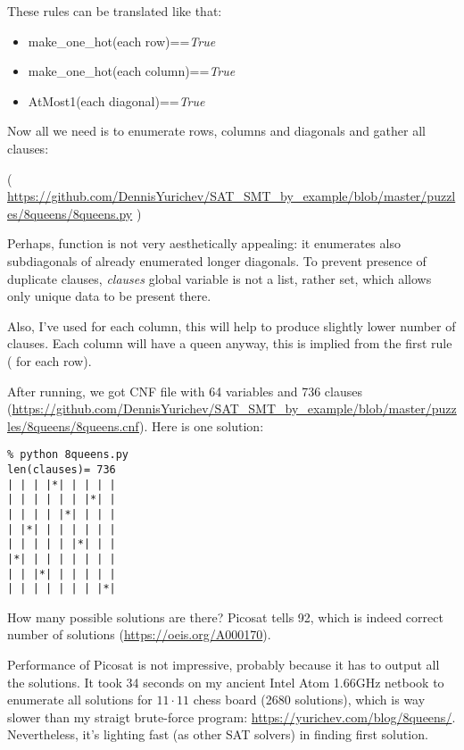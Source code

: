 These rules can be translated like that:

\begin{itemize}
\item make\_one\_hot(each row)==\emph{True}

\item make\_one\_hot(each column)==\emph{True}

\item AtMost1(each diagonal)==\emph{True}
\end{itemize}

Now all we need is to enumerate rows, columns and diagonals and gather all clauses:


( \url{https://github.com/DennisYurichev/SAT_SMT_by_example/blob/master/puzzles/8queens/8queens.py} )

Perhaps,  function is not very aesthetically appealing: it enumerates also subdiagonals
of already enumerated longer diagonals.
To prevent presence of duplicate clauses, \emph{clauses} global variable is not a list, rather set, which allows
only unique data to be present there.

Also, I've used  for each column, this will help to produce slightly lower number of clauses.
Each column will have a queen anyway, this is implied from the first rule ( for each row).

After running, we got CNF file with 64 variables and 736 clauses (\url{https://github.com/DennisYurichev/SAT_SMT_by_example/blob/master/puzzles/8queens/8queens.cnf}).
Here is one solution:

\begin{lstlisting}
% python 8queens.py
len(clauses)= 736
| | | |*| | | | |
| | | | | | |*| |
| | | | |*| | | |
| |*| | | | | | |
| | | | | |*| | |
|*| | | | | | | |
| | |*| | | | | |
| | | | | | | |*|
\end{lstlisting}

How many possible solutions are there?
Picosat tells 92, which is indeed correct number of solutions (\url{https://oeis.org/A000170}).

Performance of Picosat is not impressive, probably because it has to output all the solutions.
It took 34 seconds on my ancient Intel Atom 1.66GHz netbook to enumerate all solutions for $11 \cdot 11$ chess board
(2680 solutions),
which is way slower than my straigt brute-force program: \url{https://yurichev.com/blog/8queens/}.
Nevertheless, it's lighting fast (as other SAT solvers) in finding first solution.

